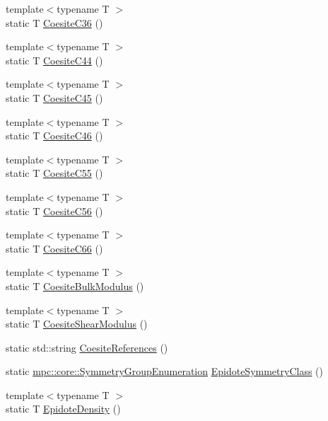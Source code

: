 \begin{DoxyCompactItemize}
\item 
{\footnotesize template$<$typename T $>$ }\\static T \mbox{\hyperlink{namespacempc_1_1data_ae0f8af5d94ac289764e8a1c452113eeb}{Coesite\+C36}} ()
\item 
{\footnotesize template$<$typename T $>$ }\\static T \mbox{\hyperlink{namespacempc_1_1data_aedee2a3507900fa2a536860a4e72a2b1}{Coesite\+C44}} ()
\item 
{\footnotesize template$<$typename T $>$ }\\static T \mbox{\hyperlink{namespacempc_1_1data_a70ba9ab1b49082b5a4ff6dfc9a2a76c3}{Coesite\+C45}} ()
\item 
{\footnotesize template$<$typename T $>$ }\\static T \mbox{\hyperlink{namespacempc_1_1data_a857ff4cf76dd69f8ba29aaad6c60006d}{Coesite\+C46}} ()
\item 
{\footnotesize template$<$typename T $>$ }\\static T \mbox{\hyperlink{namespacempc_1_1data_ae80a3d2d484654a4cfcf4ca457db13cd}{Coesite\+C55}} ()
\item 
{\footnotesize template$<$typename T $>$ }\\static T \mbox{\hyperlink{namespacempc_1_1data_ac645e3b0484f84923612da5b0dbd6de7}{Coesite\+C56}} ()
\item 
{\footnotesize template$<$typename T $>$ }\\static T \mbox{\hyperlink{namespacempc_1_1data_a67300ccd5936befbc06526c524401153}{Coesite\+C66}} ()
\item 
{\footnotesize template$<$typename T $>$ }\\static T \mbox{\hyperlink{namespacempc_1_1data_a550b6d1fd6757e162ee1039767d29e0f}{Coesite\+Bulk\+Modulus}} ()
\item 
{\footnotesize template$<$typename T $>$ }\\static T \mbox{\hyperlink{namespacempc_1_1data_acc284538072652ad8f18566db7d7d68c}{Coesite\+Shear\+Modulus}} ()
\item 
static std\+::string \mbox{\hyperlink{namespacempc_1_1data_a6e58e789c31ee9a13422ff5ef69f114e}{Coesite\+References}} ()
\item 
static \mbox{\hyperlink{namespacempc_1_1core_a9d979684062547055a0ef5c13077bad8}{mpc\+::core\+::\+Symmetry\+Group\+Enumeration}} \mbox{\hyperlink{namespacempc_1_1data_a9d3532f9c626b30d394b13e2c082377d}{Epidote\+Symmetry\+Class}} ()
\item 
{\footnotesize template$<$typename T $>$ }\\static T \mbox{\hyperlink{namespacempc_1_1data_a164ce610aeba00d2f0705fc840c601cc}{Epidote\+Density}} ()

\end{DoxyCompactItemize}
